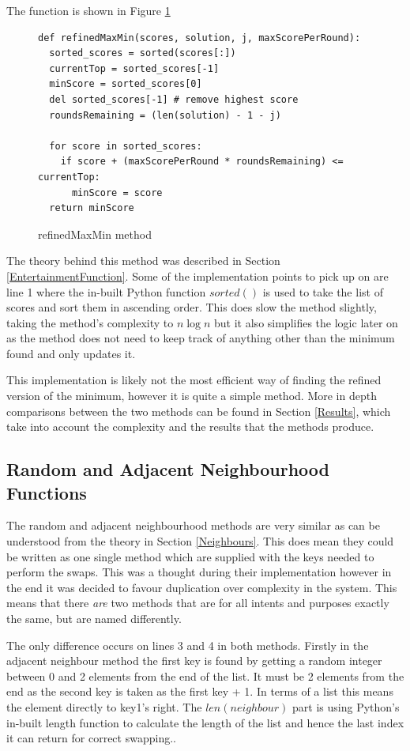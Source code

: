 \documentclass[12pt]{report}
\begin{document}
The function is shown in Figure \ref{refMaxMin}

\begin{figure}[H]
\caption{refinedMaxMin method}
\label{refMaxMin}
\begin{lstlisting}
def refinedMaxMin(scores, solution, j, maxScorePerRound):
  sorted_scores = sorted(scores[:])
  currentTop = sorted_scores[-1]
  minScore = sorted_scores[0]
  del sorted_scores[-1] # remove highest score
  roundsRemaining = (len(solution) - 1 - j)

  for score in sorted_scores:
    if score + (maxScorePerRound * roundsRemaining) <= currentTop:
      minScore = score
  return minScore
\end{lstlisting}
\end{figure}

The theory behind this method was described in Section \ref{EntertainmentFunction}. Some of the implementation points to pick up on are line 1 where the in-built Python function $sorted()$\cite{PythonSorted} is used to take the list of scores and sort them in ascending order. This does slow the method slightly, taking the method's complexity to $n \log n$ but it also simplifies the logic later on as the method does not need to keep track of anything other than the minimum found and only updates it.

This implementation is likely not the most efficient way of finding the refined version of the minimum, however it is quite a simple method. More in depth comparisons between the two methods can be found in Section \ref{Results}, which take into account the complexity and the results that the methods produce.

\subsection{Random and Adjacent Neighbourhood Functions}\label{Imp-Neighbours}
The random and adjacent neighbourhood methods are very similar as can be understood from the theory in Section \ref{Neighbours}. This does mean they could be written as one single method which are supplied with the keys needed to perform the swaps. This was a thought during their implementation however in the end it was decided to favour duplication over complexity in the system. This means that there \textit{are} two methods that are for all intents and purposes exactly the same, but are named differently.

The only difference occurs on lines 3 and 4 in both methods. Firstly in the adjacent neighbour method the first key is found by getting a random integer between 0 and 2 elements from the end of the list. It must be 2 elements from the end as the second key is taken as the first key + 1. In terms of a list this means the element directly to key1's right. The $len(neighbour)$ part is using Python's in-built length function to calculate the length of the list and hence the last index it can return for correct swapping.\cite{PythonLen}.
\end{document}
